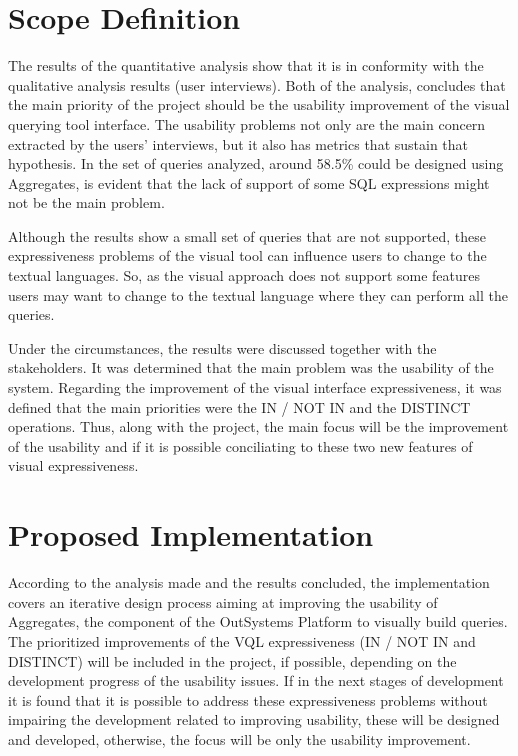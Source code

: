 \section{Scope Definition}
\label{sec:scope_definition}
The results of the quantitative analysis show that it is in conformity with the qualitative analysis results (user interviews). Both of the analysis, concludes that the main priority of the project should be the usability improvement of the visual querying tool interface. The usability problems not only are the main concern extracted by the users' interviews, but it also has metrics that sustain that hypothesis.
In the set of queries analyzed, around 58.5\% could be designed using Aggregates, is evident that the lack of support of some \gls{SQL} expressions might not be the main problem.

Although the results show a small set of queries that are not supported, these expressiveness problems of the visual tool can influence users to change to the textual languages. So, as the visual approach does not support some features users may want to change to the textual language where they can perform all the queries.

Under the circumstances, the results were discussed together with the stakeholders. It was determined that the main problem was the usability of the system. Regarding the improvement of the visual interface expressiveness, it was defined that the main priorities were the IN / NOT IN and the DISTINCT operations. Thus, along with the project, the main focus will be the improvement of the usability and if it is possible conciliating to these two new features of visual expressiveness.

\section{Proposed Implementation}
\label{sec:proposed_implementation}
According to the analysis made and the results concluded, the implementation covers an iterative design process aiming at improving the usability of Aggregates, the component of the OutSystems Platform to visually build queries. The prioritized improvements of the \gls{VQL} expressiveness (IN / NOT IN and DISTINCT) will be included in the project, if possible, depending on the development progress of the usability issues. If in the next stages of development it is found that it is possible to address these expressiveness problems without impairing the development related to improving usability, these will be designed and developed, otherwise, the focus will be only the usability improvement. %

